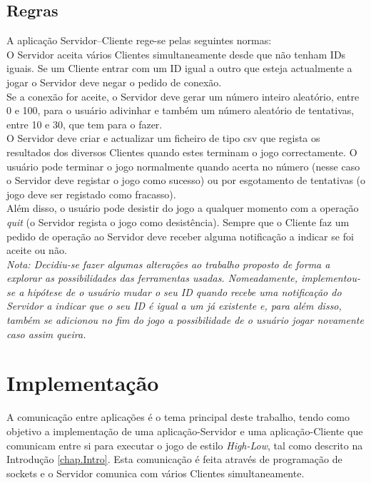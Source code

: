 \clearpage

\section{Regras}
\label{sec.regras}
A aplicação Servidor–Cliente rege-se pelas seguintes normas: \\

O Servidor aceita vários Clientes simultaneamente desde que não tenham IDs iguais. Se um Cliente entrar com um ID igual a outro que esteja actualmente a jogar o Servidor deve negar o pedido de conexão. \\

Se a conexão for aceite, o Servidor deve gerar um número inteiro aleatório, entre 0 e 100, para o usuário adivinhar e também um número aleatório de tentativas, entre 10 e 30, que tem para o fazer. \\

O Servidor deve criar e actualizar um ficheiro de tipo csv que regista os resultados dos diversos Clientes quando estes terminam o jogo correctamente. O usuário pode terminar o jogo normalmente quando acerta no número (nesse caso o Servidor deve registar o jogo como sucesso) ou por esgotamento de tentativas (o jogo deve ser registado como fracasso). \\

Além disso, o usuário pode desistir do jogo a qualquer momento com a operação \textit{quit} (o Servidor regista o jogo como desistência). Sempre que o Cliente faz um pedido de operação ao Servidor deve receber alguma notificação a indicar se foi aceite ou não. \\

\textit{Nota: Decidiu-se fazer algumas alterações ao trabalho proposto de forma a explorar as possibilidades das ferramentas usadas. Nomeadamente, implementou-se a hipótese de o usuário mudar o seu ID quando recebe uma notificação do Servidor a indicar que o seu ID é igual a um já existente e, para além disso, também se adicionou no fim do jogo a possibilidade de o usuário jogar novamente caso assim queira.} \\


\chapter{Implementação}	
\label{chap.aplicações}
A comunicação entre aplicações é o tema principal deste trabalho, tendo como objetivo a implementação de uma aplicação-Servidor e uma aplicação-Cliente que comunicam entre si para executar o jogo de estilo \textit{High-Low}, tal como descrito na Introdução \ref{chap.Intro}. Esta comunicação é feita através de programação de sockets e o Servidor comunica com vários Clientes simultaneamente. \\

